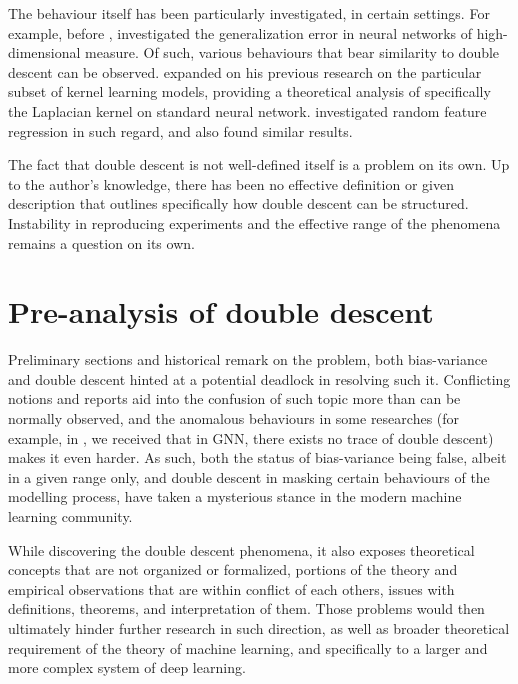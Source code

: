\documentclass{article}
\begin{document}
The behaviour itself has been particularly investigated, in certain settings. For example, before \cite{belkin_reconciling_2019}, \cite{advani2017highdimensionaldynamicsgeneralizationerror} investigated the generalization error in neural networks of high-dimensional measure. Of such, various behaviours that bear similarity to double descent can be observed. \cite{belkin2018understanddeeplearningneed} expanded on his previous research on the particular subset of kernel learning models, providing a theoretical analysis of specifically the Laplacian kernel on standard neural network. \cite{mei2020generalizationerrorrandomfeatures} investigated random feature regression in such regard, and also found similar results. 

The fact that double descent is not well-defined itself is a problem on its own. Up to the author's knowledge, there has been no effective definition or given description that outlines specifically how double descent can be structured. Instability in reproducing experiments and the effective range of the phenomena remains a question on its own. 
\clearpage
\section{Pre-analysis of double descent}
Preliminary sections and historical remark on the problem, both bias-variance and double descent hinted at a potential deadlock in resolving such it. Conflicting notions and reports aid into the confusion of such topic more than can be normally observed, and the anomalous behaviours in some researches (for example, in \cite{shi2024homophilymodulatesdoubledescent}, we received that in GNN, there exists no trace of double descent) makes it even harder. As such, both the status of bias-variance being false, albeit in a given range only, and double descent in masking certain behaviours of the modelling process, have taken a mysterious stance in the modern machine learning community. 

While discovering the double descent phenomena, it also exposes theoretical concepts that are not organized or formalized, portions of the theory and empirical observations that are within conflict of each others, issues with definitions, theorems, and interpretation of them. Those problems would then ultimately hinder further research in such direction, as well as broader theoretical requirement of the theory of machine learning, and specifically to a larger and more complex system of deep learning. 
\end{document}
